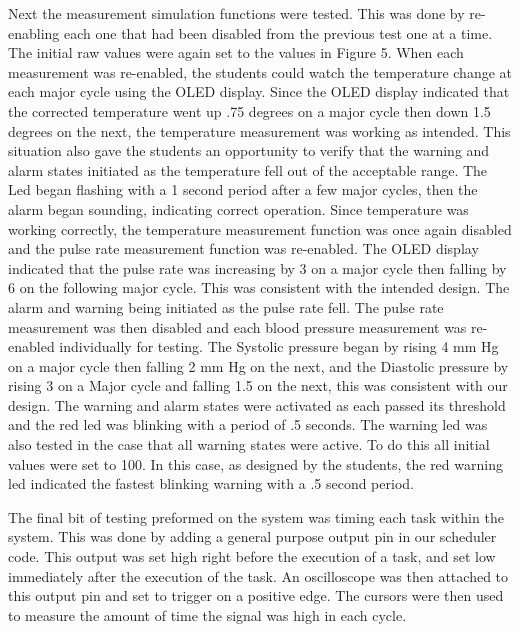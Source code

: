 \documentclass[12pt]{article} %
\begin{document}
Next the measurement simulation functions were tested. This was done by
re-enabling each one that had been disabled from the previous test one at a
time. The initial raw values were again set to the values in Figure 5. When
each measurement was re-enabled, the students could watch the temperature change
at each major cycle using the OLED display. Since the OLED display indicated
that the corrected temperature went up .75 degrees on a major cycle then down
1.5 degrees on the next, the temperature measurement was working as intended.
This situation also gave the students an opportunity to verify that the warning
and alarm states initiated as the temperature fell out of the acceptable range.
The Led began flashing with a 1 second period after a few major cycles, then
the alarm began sounding, indicating correct operation. Since temperature was
working correctly, the temperature measurement function was once again disabled
and the pulse rate measurement function was re-enabled. The OLED display
indicated that the pulse rate was increasing by 3 on a major cycle then falling
by 6 on the following major cycle. This was consistent with the intended
design. The alarm and warning being initiated as the pulse rate fell. The pulse
rate measurement was then disabled and each blood pressure measurement was
re-enabled individually for testing. The Systolic pressure began by rising 4 mm
Hg on a major cycle then falling 2 mm Hg on the next, and the Diastolic
pressure by rising 3 on a Major cycle and falling 1.5 on the next, this was
consistent with our design. The warning and alarm states were activated as each
passed its threshold and the red led was blinking with a period of .5 seconds.
The warning led was also tested in the case that all warning states were
active. To do this all initial values were set to 100. In this case, as
designed by the students, the red warning led indicated the fastest blinking
warning with a .5 second period. 

The final bit of testing preformed on the system was timing each task within
the system. This was done by adding a general purpose output pin in our
scheduler code. This output was set high right before the execution of a task,
and set low immediately after the execution of the task. An oscilloscope was
then attached to this output pin and set to trigger on a positive edge. The
cursors were then used to measure the amount of time the signal was high in
each cycle.
	
\end{document}

